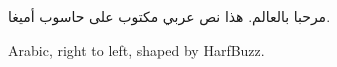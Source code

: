 \documentclass{article}
\begin{document}
مرحبا بالعالم. هذا نص عربي مكتوب على حاسوب أميغا.

\foreignlanguage{english}{Arabic, right to left, shaped by HarfBuzz.}
\end{document}

